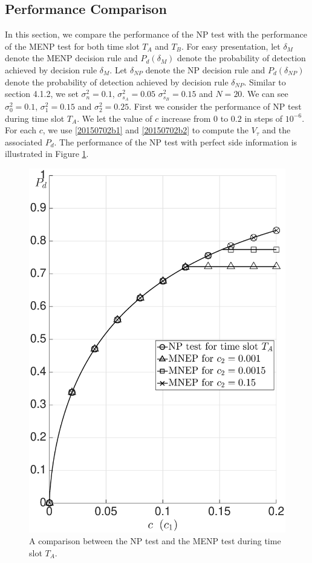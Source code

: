 \subsection{Performance Comparison}
In this section, we compare the performance of the NP test with the performance of the MENP test for both time slot $T_A$ and $T_B$. For easy presentation, let $\delta_{M}$ denote the MENP decision rule and $P_d(\delta_M)$ denote the probability of detection achieved by decision rule $\delta_{M}$.  
Let $\delta_{NP} $ denote the NP decision rule and $P_d(\delta_{NP})$ denote the probability of detection achieved by decision rule $\delta_{NP}$. 
Similar to section 4.1.2, we set $\sigma_n^2= 0.1$, $\sigma_{s_A}^2 = 0.05$ $\sigma_{s_B}^2 = 0.15$ and $N=20$. We can see $\sigma_0^2 = 0.1$, $\sigma_1^2=0.15$ and $\sigma_2^2 = 0.25$. First we consider the performance of NP test during time slot $T_A$. We let the value of $c$ increase from $0$ to $0.2$ in steps of $10^{-6}$. For each $c$, we use \eqref{20150702b1} and \eqref{20150702b2} to compute the $V_\tau$ and the associated $P_d$.  
The performance of the NP test with perfect side information is illustrated in Figure \ref{pic:20150702a0}.  

\begin{figure}[!hbp]
  \centering
  \includegraphics[width = 14cm]{5/SIa.eps}
  \caption{A comparison between the NP test and the MENP test during time slot $T_A$.} 
  \label{pic:20150702a0}
\end{figure} 

